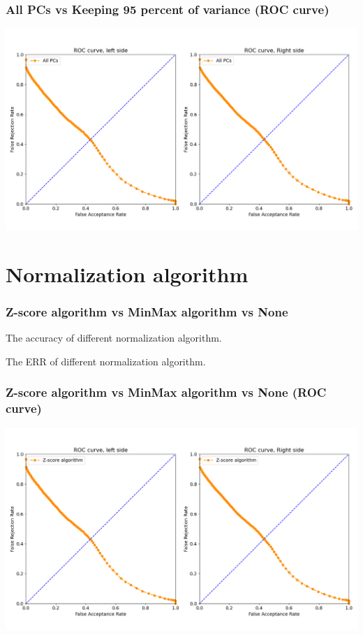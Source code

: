 \documentclass{beamer}
\begin{document}
\begin{frame}
\centering
\frametitle{All PCs vs Keeping 95 percent of variance (ROC curve)}
\includegraphics[scale=0.3]{Manuscripts/src/figures/PCA.png}
\end{frame}





\section{Normalization algorithm}
\def \variable {MinMax}%

\begin{frame}
\frametitle{Z-score algorithm vs MinMax algorithm vs None}
\tiny
\begin{table}
\centering
\captionsetup{labelformat=empty}
\caption{\small The accuracy of different normalization algorithm.}
\label{tab:parameters condition}

\end{table}
\begin{table}
\centering
\captionsetup{labelformat=empty}
\caption{\small The ERR of different normalization algorithm.}
\label{tab:parameters condition}

\end{table}
\end{frame}


\begin{frame}
\centering
\frametitle{Z-score algorithm vs MinMax algorithm vs None (ROC curve)}
\includegraphics[scale=0.3]{Manuscripts/src/figures/MinMax.png}
\end{frame}
\end{document}
